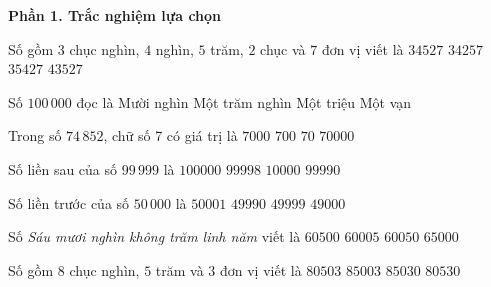 \textbf{Phần 1. Trắc nghiệm lựa chọn}

\begin{ex} %
Số gồm $3$ chục nghìn, $4$ nghìn, $5$ trăm, $2$ chục và $7$ đơn vị viết là
\choice
{\True $34527$}
{$34257$}
{$35427$}
{$43527$}
\end{ex}

\begin{ex} %
Số $100\,000$ đọc là
\choice
{Mười nghìn}
{\True Một trăm nghìn}
{Một triệu}
{Một vạn}
\end{ex}

\begin{ex} %
Trong số $74\,852$, chữ số 7 có giá trị là
\choice
{$7000$}
{$700$}
{$70$}
{\True $70000$}
\end{ex}

\begin{ex} %
Số liền sau của số $99\,999$ là
\choice
{\True $100000$}
{$99998$}
{$10000$}
{$99990$}
\end{ex}

\begin{ex} %
Số liền trước của số $50\,000$ là
\choice
{$50001$}
{$49990$}
{\True $49999$}
{$49000$}
\end{ex}

\begin{ex} %
Số \textit{Sáu mươi nghìn không trăm linh năm} viết là
\choice
{$60500$}
{\True $60005$}
{$60050$}
{$65000$}
\end{ex}

\begin{ex} %
Số gồm $8$ chục nghìn, $5$ trăm và $3$ đơn vị viết là
\choice
{\True $80503$}
{$85003$}
{$85030$}
{$80530$}
\end{ex}

